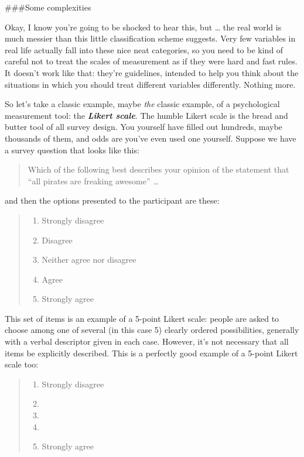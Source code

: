\documentclass[]{book}
\providecommand{\tightlist}{%
  \setlength{\itemsep}{0pt}\setlength{\parskip}{0pt}}
\begin{document}
\#\#\#Some complexities

Okay, I know you're going to be shocked to hear this, but \ldots{} the real world is much messier than this little classification scheme suggests. Very few variables in real life actually fall into these nice neat categories, so you need to be kind of careful not to treat the scales of measurement as if they were hard and fast rules. It doesn't work like that: they're guidelines, intended to help you think about the situations in which you should treat different variables differently. Nothing more.

So let's take a classic example, maybe \emph{the} classic example, of a psychological measurement tool: the \textbf{\emph{Likert scale}}. The humble Likert scale is the bread and butter tool of all survey design. You yourself have filled out hundreds, maybe thousands of them, and odds are you've even used one yourself. Suppose we have a survey question that looks like this:

\begin{quote}
Which of the following best describes your opinion of the statement that ``all pirates are freaking awesome'' \ldots{}
\end{quote}

and then the options presented to the participant are these:

\begin{quote}
\begin{enumerate}
\def\labelenumi{(\arabic{enumi})}
\tightlist
\item
  Strongly disagree
\item
  Disagree
\item
  Neither agree nor disagree
\item
  Agree
\item
  Strongly agree
\end{enumerate}
\end{quote}

This set of items is an example of a 5-point Likert scale: people are asked to choose among one of several (in this case 5) clearly ordered possibilities, generally with a verbal descriptor given in each case. However, it's not necessary that all items be explicitly described. This is a perfectly good example of a 5-point Likert scale too:

\begin{quote}
\begin{enumerate}
\def\labelenumi{(\arabic{enumi})}
\item
  Strongly disagree
\item
\item
\item
\item
  Strongly agree
\end{enumerate}
\end{quote}
\end{document}
